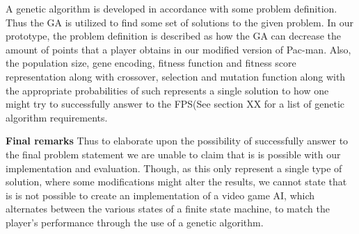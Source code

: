 A genetic algorithm is developed in accordance with some problem definition. Thus the GA is utilized to find some set of solutions to the given problem. In our prototype, the problem definition is described as how the GA can decrease the amount of points that a player obtains in our modified version of Pac-man.  Also, the population size, gene encoding, fitness function and fitness score representation along with crossover, selection and mutation function along with the appropriate probabilities of such represents a single solution to how one might try to successfully answer to the FPS(See section  XX for a list of genetic algorithm requirements.

 

\textbf{Final remarks}
Thus to elaborate upon the possibility of successfully answer to the final problem statement we are unable to claim that is is possible with our implementation and evaluation. Though, as this only represent a single type of solution, where some modifications might alter the results, we cannot state that is is not possible to create an implementation of a video game AI, which alternates between the various states of a finite state machine, to match the player's performance through the use of a genetic algorithm.

